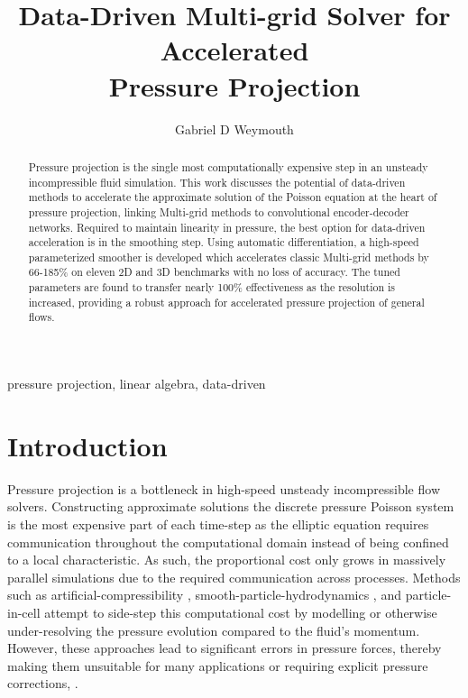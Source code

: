 \documentclass[review]{elsarticle}
\begin{document}
\begin{frontmatter}

\title{Data-Driven Multi-grid Solver for Accelerated \\ Pressure Projection}

\author{Gabriel D Weymouth}
\address{Engineering and Physical Sciences, University of Southampton, Southampton, UK}
\address{Data-Centric Engineering, Alan Turing Institute, London, UK}

\begin{abstract}
Pressure projection is the single most computationally expensive step in an unsteady incompressible fluid simulation. This work discusses the potential of data-driven methods to accelerate the approximate solution of the Poisson equation at the heart of pressure projection, linking Multi-grid methods to convolutional encoder-decoder networks. Required to maintain linearity in pressure, the best option for data-driven acceleration is in the smoothing step. Using automatic differentiation, a high-speed parameterized smoother is developed which accelerates classic Multi-grid methods by 66-185\% on eleven 2D and 3D benchmarks with no loss of accuracy. The tuned parameters are found to transfer nearly 100\% effectiveness as the resolution is increased, providing a robust approach for accelerated pressure projection of general flows.
\end{abstract}

\begin{keyword}
pressure projection, linear algebra, data-driven
\end{keyword}

\end{frontmatter}

\section{Introduction}

Pressure projection is a bottleneck in high-speed unsteady incompressible flow solvers. Constructing approximate solutions the discrete pressure Poisson system is the most expensive part of each time-step as the elliptic equation requires communication throughout the computational domain instead of being confined to a local characteristic. As such, the proportional cost only grows in massively parallel simulations due to the required communication across processes. Methods such as artificial-compressibility \cite{he2002comparison}, smooth-particle-hydrodynamics \cite{kiara2013sph}, and particle-in-cell \cite{jiang2017angular} attempt to side-step this computational cost by modelling or otherwise under-resolving the pressure evolution compared to the fluid's momentum. However, these approaches lead to significant errors in pressure forces, thereby making them unsuitable for many applications or requiring explicit pressure corrections, \cite{kiara2013sph}.
\end{document}
